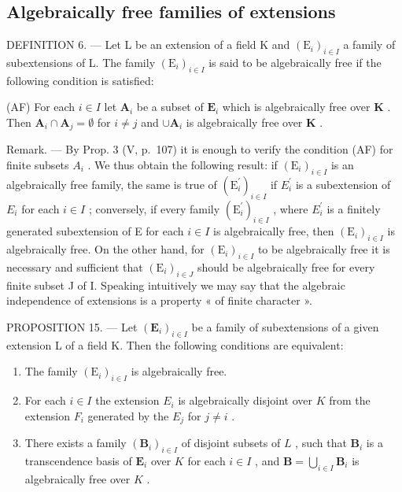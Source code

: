 \subsection{Algebraically free families of extensions}

DEFINITION 6. --- Let L be an extension of a field K and \((\mathrm{E}_{i})_{i\in I}\) a family of subextensions of L. The family \((\mathrm{E}_{i})_{i\in I}\) is said to be algebraically free if the following condition is satisfied:

(AF) For each \(i \in I\) let \(\mathbf{A}_i\) be a subset of \(\mathbf{E}_i\) which is algebraically free over \(\mathbf{K}\) . Then \(\mathbf{A}_i \cap \mathbf{A}_j = \emptyset\) for \(i \neq j\) and \(\cup \mathbf{A}_i\) is algebraically free over \(\mathbf{K}\) .

Remark. --- By Prop. 3 (V, p.~107) it is enough to verify the condition (AF) for finite subsets \(A_{i}\) . We thus obtain the following result: if \((\mathrm{E}_{i})_{i\in I}\) is an algebraically free family, the same is true of \((\mathrm{E}_{i}^{\prime})_{i\in I}\) if \(E_{i}^{\prime}\) is a subextension of \(E_{i}\) for each \(i\in I\) ; conversely, if every family \((\mathrm{E}_{i}^{\prime})_{i\in I}\) , where \(E_{i}^{\prime}\) is a finitely generated subextension of E for each \(i\in I\) is algebraically free, then \((\mathrm{E}_{i})_{i\in I}\) is algebraically free. On the other hand, for \((\mathrm{E}_{i})_{i\in I}\) to be algebraically free it is necessary and sufficient that \((\mathrm{E}_{i})_{i\in J}\) should be algebraically free for every finite subset J of I. Speaking intuitively we may say that the algebraic independence of extensions is a property « of finite character ».

PROPOSITION 15. --- Let \((\mathbf{E}_i)_{i\in I}\) be a family of subextensions of a given extension L of a field K. Then the following conditions are equivalent:

\begin{enumerate}
\def\labelenumi{\alph{enumi})}
\item
  The family \((\mathrm{E}_i)_{i\in I}\) is algebraically free.
\item
  For each \(i \in I\) the extension \(E_i\) is algebraically disjoint over \(K\) from the extension \(F_i\) generated by the \(E_j\) for \(j \neq i\) .
\item
  There exists a family \((\mathbf{B}_i)_{i\in I}\) of disjoint subsets of \(L\) , such that \(\mathbf{B}_i\) is a transcendence basis of \(\mathbf{E}_i\) over \(K\) for each \(i\in I\) , and \(\mathbf{B} = \bigcup_{i\in I}\mathbf{B}_i\) is algebraically free over \(K\) .
\end{enumerate}

